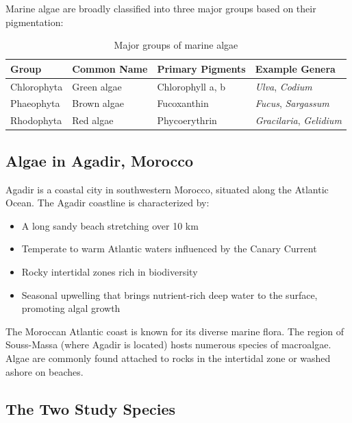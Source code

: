 \documentclass[12pt,a4paper]{article}
\begin{document}
Marine algae are broadly classified into three major groups based on their pigmentation:

\begin{table}[H]
    \centering
    \caption{Major groups of marine algae}
    \begin{tabular}{@{}llll@{}}
        \toprule
        \textbf{Group} & \textbf{Common Name} & \textbf{Primary Pigments} & \textbf{Example Genera} \\
        \midrule
        Chlorophyta  & Green algae  & Chlorophyll a, b      & \textit{Ulva}, \textit{Codium} \\
        Phaeophyta   & Brown algae  & Fucoxanthin           & \textit{Fucus}, \textit{Sargassum} \\
        Rhodophyta   & Red algae    & Phycoerythrin         & \textit{Gracilaria}, \textit{Gelidium} \\
        \bottomrule
    \end{tabular}
\end{table}

\subsection{Algae in Agadir, Morocco}

Agadir is a coastal city in southwestern Morocco, situated along the Atlantic Ocean. The Agadir coastline is characterized by:

\begin{itemize}
    \item A long sandy beach stretching over 10 km
    \item Temperate to warm Atlantic waters influenced by the Canary Current
    \item Rocky intertidal zones rich in biodiversity
    \item Seasonal upwelling that brings nutrient-rich deep water to the surface, promoting algal growth
\end{itemize}

The Moroccan Atlantic coast is known for its diverse marine flora. The region of Souss-Massa (where Agadir is located) hosts numerous species of macroalgae. Algae are commonly found attached to rocks in the intertidal zone or washed ashore on beaches.

\subsection{The Two Study Species}
\end{document}
